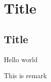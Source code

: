 \documentclass[12pt,a4paper,teal]{bbe}
\begin{document}
	\chapter{Title}
	\section{Title}
	\begin{definition}
	Hello world
	\end{definition}
	\begin{remark}
	This is remark
	\end{remark}
	
 \blinddocument
 
\end{document}

